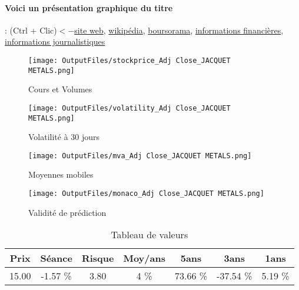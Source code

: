 \documentclass[11pt,a4paper]{report}%
\begin{document}
\paragraph{Voici un présentation graphique du titre} : (Ctrl + Clic)$<-$\href{https://corporate.jacquetmetals.com/}{site web}, \href{https://fr.wikipedia.org/wiki/Jacquet_M%C3%A9tal_Service}{wikipédia}, \href{https://www.boursorama.com/cours/1rPJCQ}{boursorama}, \href{https://www.qwant.com/?q=site:https:%2f%2fwww.easybourse.com%2faction-societe%2fJACQUET-METALS&t=web&client=ext-firefox-hp}{informations financières}, \href{https://bourse.lerevenu.com/cours-de-bourse/fiche-valeur-synthese/JACQUET-METALS/JCQ-FR}{informations journalistiques}
\begin{figure}[!htb]
   \begin{minipage}{0.5\textwidth}
     \centering
     \texttt{[image: OutputFiles/stockprice\_Adj Close\_JACQUET METALS.png]}
     \caption{Cours et Volumes}\label{Fig:price_JACQUET METALS}
   \end{minipage}\hfill
   \begin{minipage}{0.5\textwidth}
     \centering
     \texttt{[image: OutputFiles/volatility\_Adj Close\_JACQUET METALS.png]}
     \caption{Volatilité à 30 jours}\label{Fig:volat_JACQUET METALS}
   \end{minipage}
\end{figure}
\begin{figure}[!htb]
   \begin{minipage}{0.5\textwidth}
     \centering
     \texttt{[image: OutputFiles/mva\_Adj Close\_JACQUET METALS.png]}
     \caption{Moyennes mobiles}\label{Fig:mva_JACQUET METALS}
   \end{minipage}\hfill
   \begin{minipage}{0.5\textwidth}
     \centering
     \texttt{[image: OutputFiles/monaco\_Adj Close\_JACQUET METALS.png]}
     \caption{Validité de prédiction}\label{Fig:prediction_JACQUET METALS}
   \end{minipage}
\end{figure}

\begin{table}[H]
  \centering
    \begin{tabular}{|c|c|c|c|c|c|c|}
    \hline
    Prix & Séance & Risque  & Moy/ans & 5ans & 3ans & 1ans \\
    \hline
    15.00 &    -1.57 \%    & 3.80 & 4 \% & 73.66 \% & -37.54 \% & 5.19 \% \\
    \hline
    \end{tabular}%
        \label{tab:table_JACQUET METALS}%
      \caption{Tableau de valeurs}
\end{table}%
\end{document}
